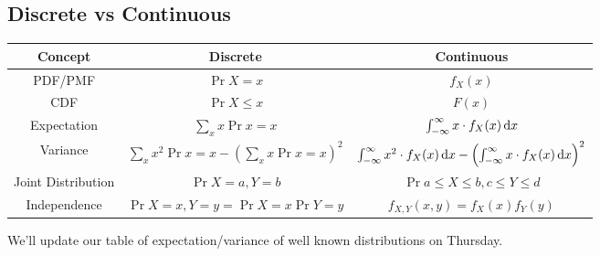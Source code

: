 \subsection{Discrete vs Continuous}
\begin{tabular}{|c|c|c|}
    \hline
    Concept & Discrete & Continuous \\
    \hline 
    PDF/PMF & $\Pr{X = x}$ & $f_X(x)$ \\
    \hline 
    CDF & $\Pr{X \le x}$ & $F(x)$ \\ 
    \hline 
    Expectation & $\sum_{x} x \Pr{x=x}$ & $\int_{-\infty}^{\infty} x \cdot f_{X}(x) \operatorname{d\!} x$ \\
    \hline 
    Variance & $\sum_{x} x^2 \Pr{x=x} - \left(\sum_{x} x \Pr{x=x}\right)^2$ & $\int_{-\infty}^{\infty} x^2 \cdot f_{X}(x) \operatorname{d\!} x - \left(\int_{-\infty}^{\infty} x \cdot f_{X}(x) \operatorname{d\!} x\right)^2$\\
    \hline 
    Joint Distribution & $\Pr{X=a, Y=b}$ & $\Pr{a \le X \le b, c \le Y \le d}$ \\
    \hline 
    Independence & $\Pr{X=x, Y=y} = \Pr{X=x}\Pr{Y=y}$ & $f_{X,Y}(x,y) = f_X(x) f_Y(y)$ \\ 
    \hline
\end{tabular}

We'll update our table of expectation/variance of well known distributions on Thursday. 